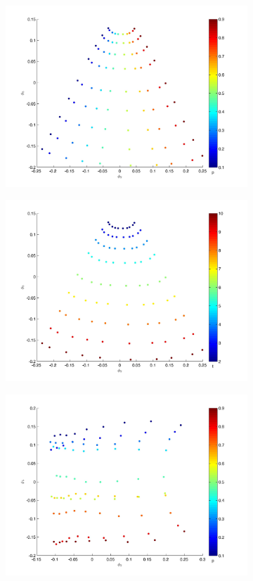 \documentclass[prl,preprint]{revtex4-1}
\begin{document}
\begin{figure}[htb]
\begin{subfigure}{0.5\textwidth}
\includegraphics[width=\textwidth]{EMD_p_1}
\caption{}
\end{subfigure}
\begin{subfigure}{0.5\textwidth}
\includegraphics[width=\textwidth]{EMD_t_1}
\caption{}
\end{subfigure}
\begin{subfigure}{0.5\textwidth}
\includegraphics[width=\textwidth]{EMD_p_400}

\end{subfigure}
\end{figure}
\end{document}
